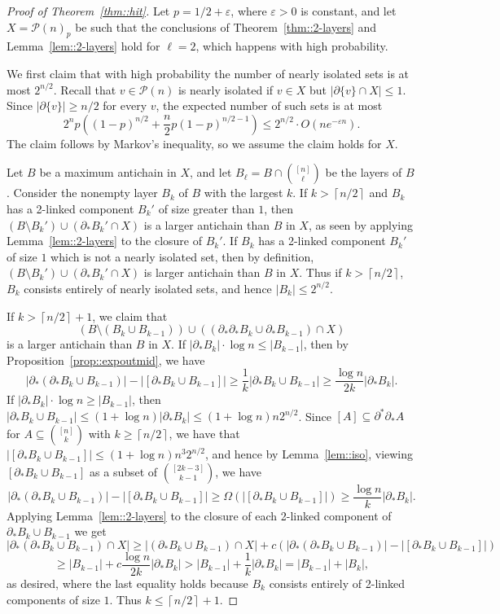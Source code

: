 \documentclass[12pt]{article}
\newcommand{\ep}{\varepsilon}
\renewcommand{\P}{\mathcal{P}}
\newcommand{\ceil}[1]{\left\lceil#1\right\rceil}
\begin{document}
\begin{proof}[Proof of Theorem~\ref{thm::hit}]
Let $p=1/2+\ep$, where $\ep>0$ is constant, and let $X = \P(n)_p$ be such that the conclusions of Theorem~\ref{thm::2-layers} and Lemma~\ref{lem::2-layers} hold for $\ell=2$, which happens with high probability.

We first claim that with high probability the number of nearly isolated sets is at most $2^{n/2}$. Recall that $v \in \P(n)$ is nearly isolated if $v \in X$ but $|\partial \{v\} \cap X| \leq 1$. Since $|\partial\{v\}| \geq n/2$ for every $v$, the expected number of such sets is at most
\[ 2^n p \left( (1-p)^{n/2} + \frac{n}{2} p(1-p)^{n/2-1} \right) \leq 2^{n/2} \cdot O(n e^{-\ep n}) .\]
The claim follows by Markov's inequality, so we assume the claim holds for $X$.

Let $B$ be a maximum antichain in $X$, and let $B_\ell = B \cap \binom{[n]}{\ell}$ be the layers of $B$. Consider the nonempty layer $B_k$ of $B$ with the largest $k$. If $k > \ceil{n/2}$ and $B_k$ has a 2-linked component $B_k'$ of size greater than $1$, then $(B \setminus B_k') \cup (\partial_* B_k' \cap X)$ is a larger antichain than $B$ in $X$, as seen by applying Lemma~\ref{lem::2-layers} to the closure of $B_k'$. If $B_k$ has a 2-linked component $B_k'$ of size $1$ which is not a nearly isolated set, then by definition, $(B \setminus B_k') \cup (\partial_* B_k' \cap X)$ is larger antichain than $B$ in $X$. Thus if $k>\ceil{n/2}$, $B_k$ consists entirely of nearly isolated sets, and hence $|B_k| \leq 2^{n/2}$.

If $k>\ceil{n/2}+1$, we claim that
\[ (B \setminus (B_k \cup B_{k-1})) \cup ((\partial_* \partial_* B_k \cup \partial_* B_{k-1}) \cap X) \]
is a larger antichain than $B$ in $X$. If $|\partial_* B_k| \cdot \log n \leq |B_{k-1}|$, then by Proposition~\ref{prop::expoutmid}, we have
\[ |\partial_*(\partial_* B_k \cup B_{k-1})| - |[\partial_* B_k \cup B_{k-1}]| \geq \frac{1}{k} |\partial_* B_k \cup B_{k-1}| \geq \frac{\log n}{2k} |\partial_* B_k| .\]
If $|\partial_* B_k| \cdot \log n \geq |B_{k-1}|$, then $|\partial_* B_k \cup B_{k-1}| \leq (1+\log n) |\partial_* B_k| \leq (1+\log n) n 2^{n/2}$. Since $[A] \subseteq \partial^* \partial_* A$ for $A \subseteq \binom{[n]}{k}$ with $k \geq \ceil{n/2}$, we have that $|[\partial_* B_k \cup B_{k-1}]| \leq (1+\log n) n^3 2^{n/2}$, and hence by Lemma~\ref{lem::iso}, viewing $[\partial_* B_k \cup B_{k-1}]$ as a subset of $\binom{[2k-3]}{k-1}$, we have
\[ |\partial_*(\partial_* B_k \cup B_{k-1})| - |[\partial_* B_k \cup B_{k-1}]| \geq \Omega(|[\partial_* B_k \cup B_{k-1}]|) \geq \frac{\log n}{k} |\partial_* B_k| .\]
Applying Lemma~\ref{lem::2-layers} to the closure of each 2-linked component of $\partial_* B_k \cup B_{k-1}$ we get
\[ |\partial_*(\partial_* B_k \cup B_{k-1}) \cap X| \geq |(\partial_* B_k \cup B_{k-1}) \cap X| + c(|\partial_*(\partial_* B_k \cup B_{k-1})| -|[\partial_* B_k \cup B_{k-1}]|) \]
\[ \geq |B_{k-1}| + c\frac{\log n}{2k} |\partial_* B_k| > |B_{k-1}| + \frac{1}{k} |\partial_* B_k| = |B_{k-1}| + |B_k| ,\]
as desired, where the last equality holds because $B_k$ consists entirely of 2-linked components of size $1$. Thus $k \leq \ceil{n/2}+1$.


\end{proof}
\end{document}
